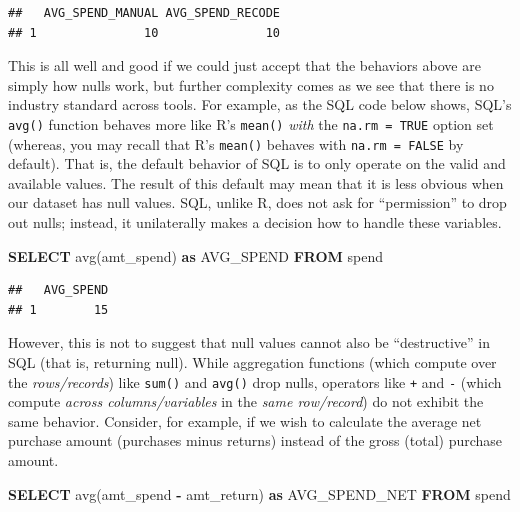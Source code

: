 \documentclass[
]{krantz}
\makeatletter
\newenvironment{Shaded}{\begin{snugshade}}{\end{snugshade}}
\newcommand{\FunctionTok}[1]{\textcolor[rgb]{0,0,0}{#1}}
\newcommand{\KeywordTok}[1]{\textcolor[rgb]{0.27,0.27,0.27}{\textbf{#1}}}
\newcommand{\NormalTok}[1]{#1}
\newcommand{\OperatorTok}[1]{\textcolor[rgb]{0.43,0.43,0.43}{\textbf{#1}}}
\newenvironment{kframe}{%
\medskip{}
\setlength{\fboxsep}{.8em}
 \def\at@end@of@kframe{}%
 \ifinner\ifhmode%
  \def\at@end@of@kframe{\end{minipage}}%
  \begin{minipage}{\columnwidth}%
 \fi\fi%
 \def\FrameCommand##1{\hskip\@totalleftmargin \hskip-\fboxsep
 \colorbox{shadecolor}{##1}\hskip-\fboxsep
     \hskip-\linewidth \hskip-\@totalleftmargin \hskip\columnwidth}%
 \MakeFramed {\advance\hsize-\width
   \@totalleftmargin\z@ \linewidth\hsize
   \@setminipage}}%
 {\par\unskip\endMakeFramed%
 \at@end@of@kframe}
\renewenvironment{Shaded}{\begin{kframe}}{\end{kframe}}
\makeatother
\begin{document}
\begin{verbatim}
##   AVG_SPEND_MANUAL AVG_SPEND_RECODE
## 1               10               10
\end{verbatim}

This is all well and good if we could just accept that the behaviors above are simply how nulls work, but further complexity comes as we see that there is no industry standard across tools.
For example, as the SQL code below shows, SQL's \texttt{avg()} function behaves more like R's \texttt{mean()} \emph{with} the \texttt{na.rm\ =\ TRUE} option set (whereas, you may recall that R's \texttt{mean()} behaves with \texttt{na.rm\ =\ FALSE} by default).
That is, the default behavior of SQL is to only operate on the valid and available values.
The result of this default may mean that it is less obvious when our dataset has null values.
SQL, unlike R, does not ask for ``permission'' to drop out nulls;
instead, it unilaterally makes a decision how to handle these variables.

\begin{Shaded}
\begin{Highlighting}[]
\KeywordTok{SELECT} 
  \FunctionTok{avg}\NormalTok{(amt\_spend) }\KeywordTok{as}\NormalTok{ AVG\_SPEND}
\KeywordTok{FROM}\NormalTok{ spend}
\end{Highlighting}
\end{Shaded}

\begin{verbatim}
##   AVG_SPEND
## 1        15
\end{verbatim}

However, this is not to suggest that null values cannot also be ``destructive'' in SQL (that is, returning null).
While aggregation functions (which compute over the \emph{rows/records}) like \texttt{sum()} and \texttt{avg()} drop nulls, operators like \texttt{+} and \texttt{-} (which compute \emph{across columns/variables} in the \emph{same row/record}) do not exhibit the same behavior.
Consider, for example, if we wish to calculate the average net purchase amount (purchases minus returns) instead of the gross (total) purchase amount.

\begin{Shaded}
\begin{Highlighting}[]
\KeywordTok{SELECT} 
  \FunctionTok{avg}\NormalTok{(amt\_spend }\OperatorTok{{-}}\NormalTok{ amt\_return) }\KeywordTok{as}\NormalTok{ AVG\_SPEND\_NET}
\KeywordTok{FROM}\NormalTok{ spend}
\end{Highlighting}
\end{Shaded}
\end{document}
